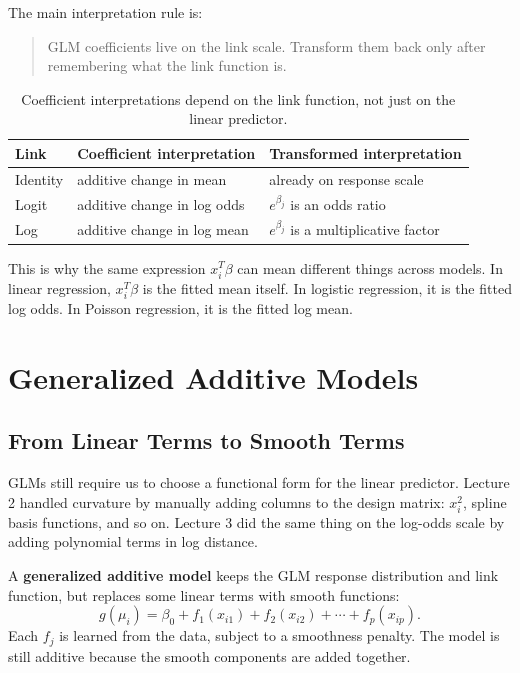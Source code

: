 \documentclass[twoside]{article}
\theoremstyle{definition}
\begin{document}
The main interpretation rule is:
\begin{quote}
    GLM coefficients live on the link scale. Transform them back only after remembering what the link function is.
\end{quote}

\begin{table}[H]
    \centering
    \begin{tabular}{lll}
        \toprule
        Link & Coefficient interpretation & Transformed interpretation \\
        \midrule
        Identity & additive change in mean & already on response scale \\
        Logit & additive change in log odds & $e^{\beta_j}$ is an odds ratio \\
        Log & additive change in log mean & $e^{\beta_j}$ is a multiplicative factor \\
        \bottomrule
    \end{tabular}
    \caption{Coefficient interpretations depend on the link function, not just on the linear predictor.}
    \label{tab:link-interpretation}
\end{table}

This is why the same expression $x_i^T\beta$ can mean different things across models. In linear regression, $x_i^T\beta$ is the fitted mean itself. In logistic regression, it is the fitted log odds. In Poisson regression, it is the fitted log mean.

\section{Generalized Additive Models}

\subsection{From Linear Terms to Smooth Terms}

GLMs still require us to choose a functional form for the linear predictor. Lecture 2 handled curvature by manually adding columns to the design matrix: $x_i^2$, spline basis functions, and so on. Lecture 3 did the same thing on the log-odds scale by adding polynomial terms in log distance.

A \textbf{generalized additive model} keeps the GLM response distribution and link function, but replaces some linear terms with smooth functions:
\[
    g(\mu_i) = \beta_0 + f_1(x_{i1}) + f_2(x_{i2}) + \cdots + f_p(x_{ip}).
\]
Each $f_j$ is learned from the data, subject to a smoothness penalty. The model is still additive because the smooth components are added together.
\end{document}
